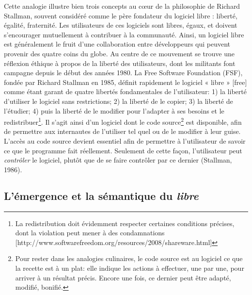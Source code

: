 \documentclass[
  letterpaper,
  DIV=11,
  numbers=noendperiod,
  oneside]{scrreprt}
\begin{document}
Cette analogie illustre bien trois concepts au cœur de la philosophie de
Richard Stallman, souvent considéré comme le père fondateur du logiciel
libre : liberté, égalité, fraternité. Les utilisateurs de ces logiciels
sont libres, égaux, et doivent s'encourager mutuellement à contribuer à
la communauté. Ainsi, un logiciel libre est généralement le fruit d'une
collaboration entre développeurs qui peuvent provenir des quatre coins
du globe. Au centre de ce mouvement se trouve une réflexion éthique à
propos de la liberté des utilisateurs, dont les militants font campagne
depuis le début des années 1980. La Free Software Foundation (FSF),
fondée par Richard Stallman en 1985, définit rapidement le logiciel «
libre » {[}free{]} comme étant garant de quatre libertés fondamentales
de l'utilisateur: 1) la liberté d'utiliser le logiciel sans
restrictions; 2) la liberté de le copier; 3) la liberté de l'étudier; 4)
puis la liberté de le modifier pour l'adapter à ses besoins et le
redistribuer\footnote{La redistribution doit évidemment respecter
  certaines conditions précises, dont la violation peut mener à des
  condamnations
  {[}http://www.softwarefreedom.org/resources/2008/shareware.html{]}}.
Il s'agit ainsi d'un logiciel dont le code source\footnote{Pour rester
  dans les analogies culinaires, le code source est au logiciel ce que
  la recette est à un plat: elle indique les actions à effectuer, une
  par une, pour arriver à un résultat précis. Encore une fois, ce
  dernier peut être adapté, modifié, bonifié.} est disponible, afin de
permettre aux internautes de l'utiliser tel quel ou de le modifier à
leur guise. L'accès au code source devient essentiel afin de permettre à
l'utilisateur de savoir ce que le programme fait réellement. Seulement
de cette façon, l'utilisateur peut \emph{contrôler} le logiciel, plutôt
que de se faire contrôler par ce dernier (Stallman, 1986).

\hypertarget{luxe9mergence-et-la-suxe9mantique-du-libre}{%
\subsection{\texorpdfstring{L'émergence et la sémantique du
\emph{libre}}{L'émergence et la sémantique du libre}}\label{luxe9mergence-et-la-suxe9mantique-du-libre}}
\end{document}
